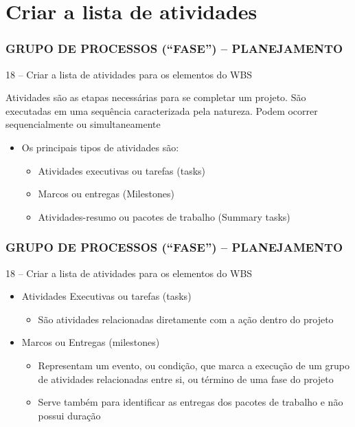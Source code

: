 \section{Criar a lista de atividades}
\begin{frame}
 \frametitle{GRUPO DE PROCESSOS (“FASE”) – PLANEJAMENTO}
18 – Criar a lista de atividades para os elementos do WBS
  \begin{block}{}
 Atividades são as etapas necessárias para se completar um projeto.  São executadas em uma sequência caracterizada pela natureza. Podem ocorrer sequencialmente ou simultaneamente
  \end{block}
  \begin{itemize}
   \item Os principais tipos de atividades são:
   \begin{itemize}
    \item Atividades executivas ou tarefas (tasks)
    \item Marcos ou entregas (Milestones)
    \item Atividades-resumo ou pacotes de trabalho (Summary tasks)
   \end{itemize}
  \end{itemize}
\end{frame}

\begin{frame}
 \frametitle{GRUPO DE PROCESSOS (“FASE”) – PLANEJAMENTO}
18 – Criar a lista de atividades para os elementos do WBS
  \begin{itemize}
   \item Atividades Executivas ou tarefas (tasks)
   \begin{itemize}
    \item São atividades relacionadas diretamente com a ação dentro do projeto
   \end{itemize}
   \item Marcos ou Entregas (milestones)
   \begin{itemize}
    \item Representam um evento, ou condição, que marca a execução de um grupo de atividades relacionadas entre si, ou término de uma fase do projeto
    \item Serve também para identificar as entregas dos pacotes de trabalho e não possui duração
   \end{itemize}
  \end{itemize}
\end{frame}

